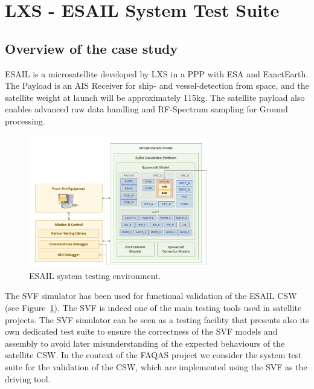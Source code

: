
\section{LXS - ESAIL System Test Suite}
\label{chapter:caseStudies:LXS}

\subsection{Overview of the case study}

ESAIL is a microsatellite developed by LXS in a PPP with ESA and ExactEarth. 
The Payload is an AIS Receiver for ship- and vessel-detection from space, and the satellite weight at launch will be approximately 115kg. The satellite payload also enables advanced raw data handling and RF-Spectrum sampling for Ground processing.

\begin{figure}[h]
	\centering
    \includegraphics[width=0.7\textwidth]{images/esail}
    \caption{ESAIL system testing environment.}
    \label{fig:esail_case_study}
\end{figure}
 
The SVF simulator has been used for functional validation of the ESAIL CSW (see Figure~\ref{fig:esail_case_study}). The SVF is indeed one of the main testing tools used in satellite projects. The SVF simulator can be seen as a testing facility that presents also its own dedicated test suite to ensure the correctness of the SVF models and assembly to avoid later misunderstanding of the expected behaviours of the satellite CSW. 
In the context of the FAQAS project we consider the system test suite for the validation of the CSW, which are implemented using the SVF as the driving tool.

